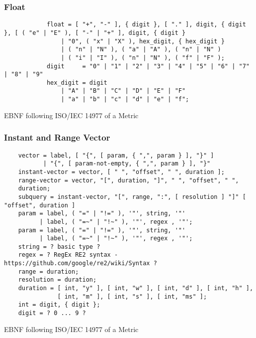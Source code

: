 \subsubsection{Float}
\begin{listing}[H]
	\begin{samepage}
		\begin{verbatim}
			float = [ "+", "-" ], { digit }, [ "." ], digit, { digit }, [ ( "e" | "E" ), [ "-" | "+" ], digit, { digit }
				| "0", ( "x" | "X" ), hex_digit, { hex_digit }
				| ( "n" | "N" ), ( "a" | "A" ), ( "n" | "N" )
				| ( "i" | "I" ), ( "n" | "N" ), ( "f" | "F" );
			digit     = "0" | "1" | "2" | "3" | "4" | "5" | "6" | "7" | "8" | "9"
			hex_digit = digit
				| "A" | "B" | "C" | "D" | "E" | "F"
				| "a" | "b" | "c" | "d" | "e" | "f";
		\end{verbatim}
		\caption{EBNF following ISO/IEC 14977 of a Metric}
	\end{samepage}
\end{listing}

\subsubsection{Instant and Range Vector}
\begin{listing}[H]
\begin{samepage}
\begin{verbatim}
	vector = label, [ "{", [ param, { ",", param } ], "}" ]
	       | "{", [ param-not-empty, { ",", param } ], "}"
	instant-vector = vector, [ " ", "offset", " ", duration ];
	range-vector = vector, "[", duration, "]", " ", "offset", " ",
	duration;
	subquery = instant-vector, "[", range, ":", [ resolution ] "]" [ "offset", duration ]
	param = label, ( "=" | "!=" ), '"', string, '"'
	      | label, ( "=~" | "!~" ), '"', regex , '"';
	param = label, ( "=" | "!=" ), '"', string, '"'
	      | label, ( "=~" | "!~" ), '"', regex , '"';
	string = ? basic type ?
	regex = ? RegEx RE2 syntax - https://github.com/google/re2/wiki/Syntax ?
	range = duration;
	resolution = duration;
	duration = [ int, "y" ], [ int, "w" ], [ int, "d" ], [ int, "h" ], 
		       [ int, "m" ], [ int, "s" ], [ int, "ms" ];
	int = digit, { digit };
	digit = ? 0 ... 9 ?
\end{verbatim}
\caption{EBNF following ISO/IEC 14977 of a Metric}
\end{samepage}
\end{listing}


